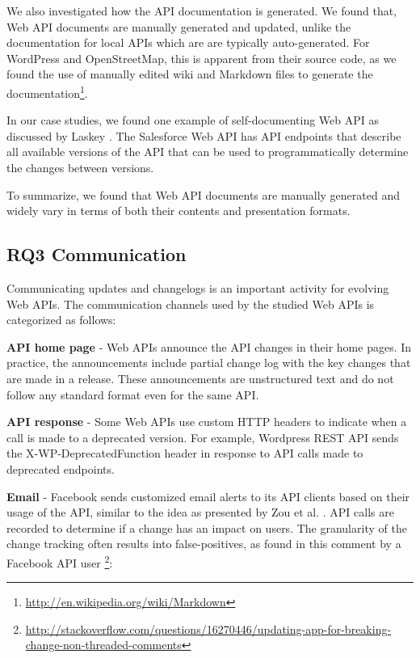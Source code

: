 We also investigated how the API documentation is generated. We found that, Web API documents are manually generated and updated, unlike the documentation for local APIs which are are typically auto-generated. For WordPress and OpenStreetMap, this is apparent from their source code, as we found the use of manually edited wiki and Markdown files to generate the documentation\footnote{\url{http://en.wikipedia.org/wiki/Markdown}}.

In our case studies, we found one example of self-documenting Web API as discussed by Laskey \cite{laskey2008considerations}. The Salesforce Web API has API endpoints that describe all available versions of the API that can be used to programmatically determine the changes between versions.

To summarize, we found that Web API documents are manually generated and widely vary in terms of both their contents and presentation formats.

\subsection{RQ3 Communication} %
\label{sub:communication}

Communicating updates and changelogs is an important activity for evolving Web APIs. The communication channels used by the studied Web APIs is categorized as follows:


  \textbf{API home page} - Web APIs announce the API changes in their home pages. In practice, the announcements include partial change log with the key changes that are made in a release. These announcements are unstructured text and do not follow any standard format even for the same API.

  \textbf{API response} - Some Web APIs use custom HTTP headers to indicate when a call is made to a deprecated version. For example, Wordpress REST API sends the X-WP-DeprecatedFunction header in response to API calls made to deprecated endpoints.

  \textbf{Email} - Facebook sends customized email alerts to its API clients based on their usage of the API, similar to the idea as presented by Zou et al. \cite{le2008synchronizing}. API calls are recorded to determine if a change has an impact on users. The granularity of the change tracking often results into false-positives, as found in this comment by a Facebook API user \footnote{\url{http://stackoverflow.com/questions/16270446/updating-app-for-breaking-change-non-threaded-comments}}:

